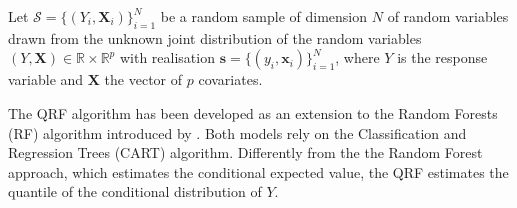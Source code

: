 





 
 


 \noindent Let $\mathcal{S}=\{(Y_i, \mathbf{X}_i)\}_{i=1}^N$ be a random sample of dimension $N$ of random variables drawn from the unknown joint distribution of the random variables $(Y, \mathbf{X})\in \mathbb{R} \times  \mathbb{R}^p$ with realisation $\mathbf{s}=\{(y_i, \mathbf{x}_i)\}_{i=1}^N$, where $Y$ is the response variable and $\mathbf{X}$ the vector of $p$ covariates.
 \vspace{0.15in}

\noindent The QRF algorithm \citep{meinshausen2006quantile} has been developed as an extension to the Random Forests (RF) algorithm introduced by \cite{breiman2001random}. Both models rely on the Classification and Regression Trees (CART) \citep{breiman1984classification} algorithm. Differently from the the Random Forest approach, which estimates the conditional expected value, the QRF estimates the quantile of the conditional distribution of $Y$.
\vspace{0.15in}


